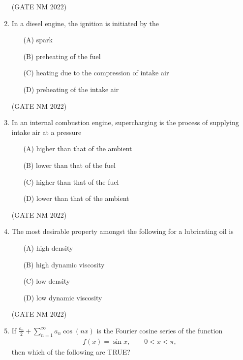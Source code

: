\documentclass[journal,12pt,onecolumn]{IEEEtran}
\theoremstyle{remark}
\begin{document}
\begin{enumerate}
\hfill(GATE NM 2022)





\item  In a diesel engine, the ignition is initiated by the

\begin{enumerate}
    \item[(A)] spark
    \item[(B)] preheating of the fuel
    \item[(C)] heating due to the compression of intake air
    \item[(D)] preheating of the intake air
\end{enumerate}

\hfill(GATE NM 2022)



\item  In an internal combustion engine, supercharging is the process of supplying intake air at a pressure

\begin{enumerate}
    \item[(A)] higher than that of the ambient
    \item[(B)] lower than that of the fuel
    \item[(C)] higher than that of the fuel
    \item[(D)] lower than that of the ambient
\end{enumerate}

\hfill(GATE NM 2022)






\item  The most desirable property amongst the following for a lubricating oil is

\begin{enumerate}
    \item[(A)] high density
    \item[(B)] high dynamic viscosity
    \item[(C)] low density
    \item[(D)] low dynamic viscosity
\end{enumerate}

\hfill(GATE NM 2022)









\item  If
$
\frac{a_0}{2} + \sum_{n=1}^{\infty} a_n \cos(nx)
$
is the Fourier cosine series of the function
\begin{align*}
f(x)=\sin x,\qquad 0<x<\pi,
\end{align*}
then which of the following are TRUE?


\end{enumerate}
\end{document}
